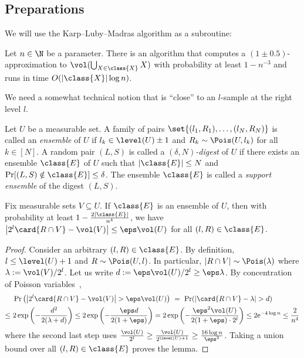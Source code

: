 \subsection{Preparations}
%
We will use the Karp--Luby--Madras algorithm as a subroutine:
%
\begin{theorem}
    \label{thm:KLM}
    Let $n \in \N$ be a parameter. There is an algorithm  that computes a $(1\pm 0.5)$-approximation to $\vol(\bigcup_{X \in \class{X}} X)$ with probability at least $1 - n^{-3}$ and runs in time $O(|\class{X}| \log n)$.
\end{theorem}
%
\noindent
We need a somewhat technical notion that is ``close'' to an $l$-sample at the right level $l$.
\begin{definition}
    \label{def:digest}
    Let $U$ be a measurable set. A family of pairs $\set{(l_1,R_1), \dots, (l_N, R_N)}$ is called an \emph{ensemble} of $U$ if $l_k \in \level(U) \pm 1$ and $R_k \sim \Pois(U,l_k)$ for all $k \in [N]$.
    A random pair $(L,S)$ is called a \emph{$(\delta,N)$-digest} of $U$ if there exists an ensemble $\class{E}$ of $U$ such that $|\class{E}| \leq N$ and $\Pr[(L,S) \notin \class{E}] \leq \delta$. The ensemble $\class{E}$ is called a \emph{support ensemble} of the digest $(L,S)$.
\end{definition}
%
\begin{lemma}
    \label{lem:ensemble}
    Fix measurable sets $V \subseteq U$. If $\class{E}$ is an ensemble of $U$, then with probability at least $1 - \frac{2|\class{E}|}{n^4}$, we have $\left| 2^l \card{R \cap V} - \vol(V) \right| \leq \eps \vol(U)$ for all $(l,R) \in \class{E}$.
\end{lemma}
%
\begin{proof}
    Consider an arbitrary $(l,R) \in \class{E}$. By definition, $l \leq \level(U)+1$ and $R \sim \Pois(U,l)$. In particular, $|R \cap V| \sim \Pois(\lambda)$ where $\lambda := \vol(V)/2^l$. Let us write $d := \eps \vol(U) / 2^l \geq \eps \lambda$. By concentration of Poisson variables~\cite{Canonne19},
    \begin{align*}
        & \Pr\left( \left| 2^l \card{R \cap V} - \vol(V) \right| > \eps \vol(U) \right) \ 
        =\ \Pr( \left| \card{R \cap V} - \lambda \right| > d ) \\
        \leq\ & 2 \exp \left( -\frac{d^2}{2 (\lambda + d)} \right) 
        \leq 2 \exp \left( - \frac{\eps d}{2 (1 + \eps)} \right)
        = 2 \exp \left( - \frac{\eps^2 \vol(U)}{2(1 + \eps)\cdot 2^l} \right)
        \leq 2 \mathrm{e}^{-4 \log n}
        \le \frac{2}{n^4}
    \end{align*}
    where the second last step uses $\frac{\vol(U)}{2^l} \geq \frac{\vol(U)}{2^{\level(U)+1}} \geq \frac{16 \log n}{\eps^2}$. Taking a union bound over all $(l,R) \in \class{E}$ proves the lemma.
\end{proof}

